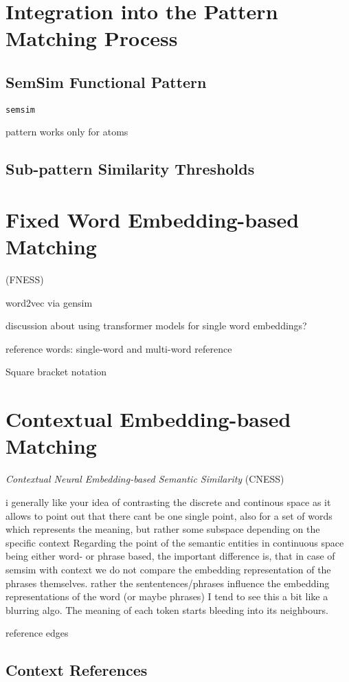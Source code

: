 \documentclass[11pt]{scrreprt}
\begin{document}
\section{Integration into the Pattern Matching Process}
\subsection{SemSim Functional Pattern}
\texttt{semsim} 

pattern works only for atoms

\subsection{Sub-pattern Similarity Thresholds}


\section{Fixed Word Embedding-based Matching}
(FNESS)
 
word2vec via gensim

discussion about using transformer models for single word embeddings?


reference words: single-word and multi-word reference

\label{sec:semsim-multi-word}
Square bracket notation 

\section{Contextual Embedding-based Matching}
\textit{Contextual Neural Embedding-based Semantic Similarity} 
(CNESS)


i generally like your idea of contrasting the discrete and continous space as it allows to point out that there cant be one single point, also for a set of words which represents the meaning, but rather some subspace depending on the specific context
Regarding the point of the semantic entities in continuous space being either word- or phrase based, the important difference is, that in case of semsim with context we do not compare the embedding representation of the phrases themselves. rather the sententences/phrases influence the embedding representations of the word (or maybe phrases)
 I tend to see this a bit like a blurring algo. The meaning of each token starts bleeding into its neighbours.


reference edges

\subsection{Context References}
\end{document}
